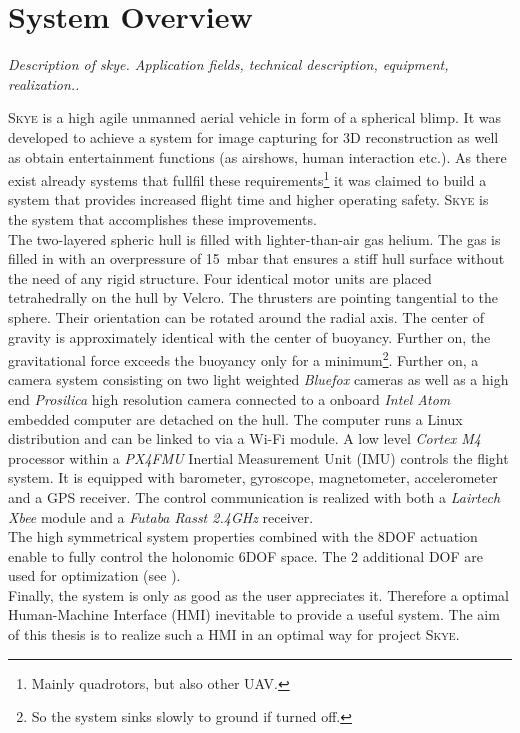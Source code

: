 \section{System Overview}
\label{sec:system overview}
\textit{Description of skye. Application fields, technical description, equipment, realization..}

\textsc{Skye} is a high agile unmanned aerial vehicle in form of a spherical blimp. It was developed to achieve a system for image capturing for 3D reconstruction as well as obtain entertainment functions (as airshows, human interaction etc.). As there exist already systems that fullfil these requirements\footnote{Mainly quadrotors, but also other UAV.} it was claimed to build a system that provides increased flight time and higher operating safety. \textsc{Skye} is the system that accomplishes these improvements. \\
The two-layered spheric hull is filled with lighter-than-air gas helium. The gas is filled in with an overpressure of \SI{15}{\milli\bar} that ensures a stiff hull surface without the need of any rigid structure. Four identical motor units are placed tetrahedrally on the hull by Velcro. The thrusters are pointing tangential to the sphere. Their orientation can be rotated around the radial axis. The center of gravity is approximately identical with the center of buoyancy. Further on, the gravitational force exceeds the buoyancy only for a minimum\footnote{So the system sinks slowly to ground if turned off.}. Further on, a camera system consisting on two light weighted \textit{Bluefox} cameras as well as a high end \textit{Prosilica} high resolution camera connected to a onboard \textit{Intel Atom} embedded computer are detached on the hull. The computer runs a Linux distribution and can be linked to via a Wi-Fi module. A low level \textit{Cortex M4} processor within a \textit{PX4FMU} Inertial Measurement Unit (IMU) controls the flight system. It is equipped with barometer, gyroscope, magnetometer, accelerometer and a GPS receiver. The control communication is realized with both a \textit{Lairtech Xbee} module and a \textit{Futaba Rasst 2.4GHz} receiver. \\
The high symmetrical system properties combined with the 8DOF actuation enable to fully control the holonomic 6DOF space. The 2 additional DOF are used for optimization (see \cite{schaffnervu}).  \\
Finally, the system is only as good as the user appreciates it. Therefore a optimal Human-Machine Interface (HMI) inevitable to provide a useful system. The aim of this thesis is to realize such a HMI in an optimal way for project \textsc{Skye}.
